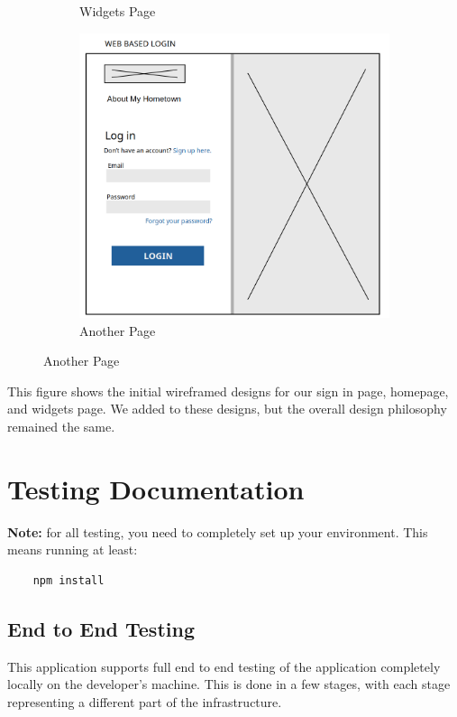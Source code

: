 \documentclass[12pt]{article}
\begin{document}
\begin{figure}[htbp]
\begin{subfigure}[b]{0.48\textwidth}
        \caption{Widgets Page}
    \end{subfigure}
    \centering
    \begin{subfigure}[b]{0.48\textwidth}
        \centering
        \includegraphics[width=\textwidth]{images/sign_in_page.png}
        \caption{Another Page}
    \end{subfigure}
\end{figure}

This figure shows the initial wireframed designs for our sign in page, homepage, and widgets page. We added to these designs, but the overall design philosophy remained the same.

\newpage

\section{Testing Documentation}

\textbf{Note:} for all testing, you need to completely set up your environment. This means running at least:
\begin{verbatim}
    npm install
\end{verbatim}

\subsection{End to End Testing}

This application supports full end to end testing of the application completely locally on the developer's machine. This is done in a few stages, with each stage representing a different part of the infrastructure.
\end{document}
